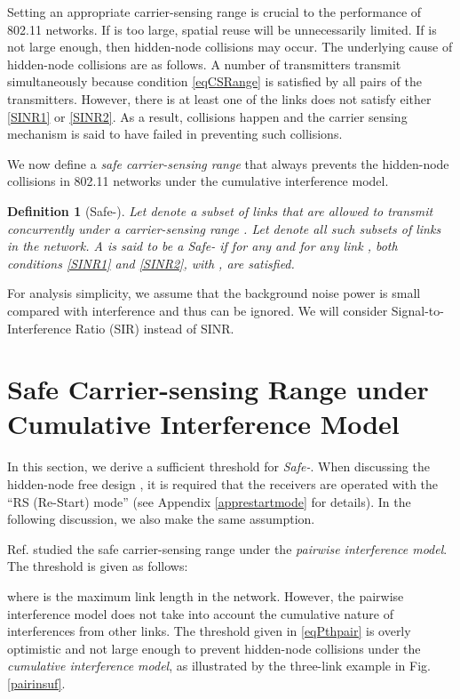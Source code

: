 \documentclass[conference]{IEEEtran}
\newtheorem{definition}{Definition}
\begin{document}
Setting an appropriate carrier-sensing range is crucial to the
performance of 802.11 networks. If  is too large, spatial reuse
will be unnecessarily limited. If  is not large enough, then
hidden-node collisions may occur. The underlying cause of
hidden-node collisions are as follows. A number of transmitters
transmit simultaneously because condition \eqref{eqCSRange} is
satisf\/ied by all pairs of the transmitters. However, there is at
least one of the links does not satisfy either \eqref{SINR1} or
\eqref{SINR2}. As a result, collisions happen and the carrier
sensing mechanism is said to have failed in preventing such
collisions.

We now def\/ine a \emph{safe carrier-sensing range} that always
prevents the hidden-node collisions in 802.11 networks under the
cumulative interference model.
\begin{definition}[Safe-]
Let  denote a subset of
links that are allowed to transmit concurrently under a
carrier-sensing range . Let
 denote all such subsets of
links in the network. A  is said to be a
\emph{Safe-} if for any
 and for any link
, both conditions \eqref{SINR1} and
\eqref{SINR2}, with
, are
satisf\/ied.
\end{definition}



For analysis simplicity, we assume that the background noise power
 is small compared with interference and thus can be ignored. We
will consider Signal-to-Interference Ratio (SIR) instead of SINR.



\section{Safe Carrier-sensing Range under Cumulative Interference
Model}\label{safecsphy}

In this section, we derive a suff\/icient threshold for
\emph{Safe-}. When discussing the
hidden-node free design \cite{LiBin}, it is required that the
receivers are operated with the ``RS (Re-Start) mode'' (see Appendix
\ref{apprestartmode} for details). In the following discussion, we
also make the same assumption.

Ref. \cite{LiBin} studied the safe carrier-sensing range under the
\emph{pairwise interference model}. The threshold is given as
follows:

where  is the maximum link length in the network.
However, the pairwise interference model does not take into account
the cumulative nature of interferences from other links. The
threshold given in \eqref{eqPthpair} is overly optimistic and not
large enough to prevent hidden-node collisions under the
\emph{cumulative interference model}, as illustrated by the
three-link example in Fig. \ref{pairinsuf}.
\end{document}
